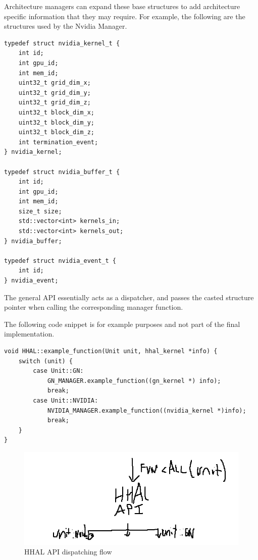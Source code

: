 Architecture managers can expand these base structures to add architecture specific information that they may require. For example, the following are the structures used by the Nvidia Manager.

\begin{lstlisting}[style=CStyle, label={HHAL:NvidiaStructs}, caption=HHAL Nvidia Manager - Extended structures]
typedef struct nvidia_kernel_t {
    int id;
    int gpu_id;
    int mem_id;
    uint32_t grid_dim_x;
    uint32_t grid_dim_y;
    uint32_t grid_dim_z;
    uint32_t block_dim_x;
    uint32_t block_dim_y;
    uint32_t block_dim_z;
    int termination_event;
} nvidia_kernel;

typedef struct nvidia_buffer_t {
    int id;
    int gpu_id;
    int mem_id;
    size_t size;
    std::vector<int> kernels_in;
    std::vector<int> kernels_out;
} nvidia_buffer;

typedef struct nvidia_event_t {
    int id;
} nvidia_event;
\end{lstlisting}

The general API essentially acts as a dispatcher, and passes the casted structure pointer when calling the corresponding manager function. 

The following code snippet is for example purposes and not part of the final implementation.

\begin{lstlisting}[style=CStyle, caption=HHAL API Example - Dispatching architecture-specific structures]
void HHAL::example_function(Unit unit, hhal_kernel *info) {
    switch (unit) {
        case Unit::GN:
            GN_MANAGER.example_function((gn_kernel *) info);
            break;
        case Unit::NVIDIA:
            NVIDIA_MANAGER.example_function((nvidia_kernel *)info);
            break;
    }
}
\end{lstlisting}

\begin{figure}[ht]
    \centering
    \includegraphics[width=\textwidth]{img/hhal_dispatcher.png}
    \captionsetup{justification=centering}
    \caption{HHAL API dispatching flow}
    \label{fig:hhal_dispatcher}
\end{figure}

